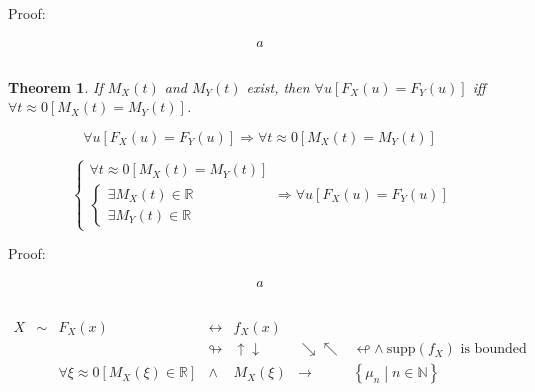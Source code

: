 \documentclass[
]{book}
\newtheorem{theorem}{Theorem}[chapter]
\theoremstyle{definition}
\theoremstyle{definition}
\theoremstyle{definition}
\theoremstyle{definition}
\theoremstyle{remark}
\begin{document}
Proof:

\[
\begin{aligned}
a
\end{aligned}
\]

\[
\tag*{$\Box$}
\]

\begin{theorem}
\protect\hypertarget{thm:unnamed-chunk-29}{}\label{thm:unnamed-chunk-29}If \(M_{{\scriptscriptstyle X}}\left(t\right)\) and \(M_{{\scriptscriptstyle Y}}\left(t\right)\) exist, then \(\forall u\left[F_{{\scriptscriptstyle X}}\left(u\right)=F_{{\scriptscriptstyle Y}}\left(u\right)\right]\) iff \(\forall t\approx0\left[M_{{\scriptscriptstyle X}}\left(t\right)=M_{{\scriptscriptstyle Y}}\left(t\right)\right]\).
\end{theorem}

\[
\forall u\left[F_{{\scriptscriptstyle X}}\left(u\right)=F_{{\scriptscriptstyle Y}}\left(u\right)\right]\Rightarrow\forall t\approx0\left[M_{{\scriptscriptstyle X}}\left(t\right)=M_{{\scriptscriptstyle Y}}\left(t\right)\right]
\]

\[
\begin{cases}
\forall t\approx0\left[M_{{\scriptscriptstyle X}}\left(t\right)=M_{{\scriptscriptstyle Y}}\left(t\right)\right]\\
\begin{cases}
\exists M_{{\scriptscriptstyle X}}\left(t\right)\in\mathbb{R}\\
\exists M_{{\scriptscriptstyle Y}}\left(t\right)\in\mathbb{R}
\end{cases}
\end{cases}\Rightarrow\forall u\left[F_{{\scriptscriptstyle X}}\left(u\right)=F_{{\scriptscriptstyle Y}}\left(u\right)\right]
\]

Proof:

\[
\begin{aligned}
a
\end{aligned}
\]

\[
\tag*{$\Box$}
\]

\[
\begin{array}{ccccccc}
X & \sim & F_{{\scriptscriptstyle X}}\left(x\right) & \leftrightarrow & f_{{\scriptscriptstyle X}}\left(x\right)\\
 &  &  & \looparrowright & \uparrow\downarrow & \searrow\nwarrow & \looparrowleft\wedge\ \mathrm{supp}\left(f_{{\scriptscriptstyle X}}\right)\text{ is bounded}\\
 &  & \forall\xi\approx0\left[M_{{\scriptscriptstyle X}}\left(\xi\right)\in\mathbb{R}\right] & \wedge & M_{{\scriptscriptstyle X}}\left(\xi\right) & \rightarrow & \left\{ \mu_{{\scriptscriptstyle n}}\middle|n\in\mathbb{N}\right\} 
\end{array}
\]
\end{document}
